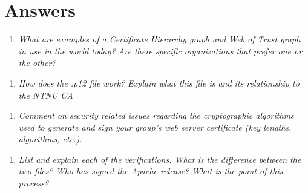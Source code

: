 %
%
%
%
%

\section{Answers}

\begin{enumerate} 
    \item \itshape What are examples of a Certificate Hierarchy graph and Web of Trust graph in use in
          the world today? Are there specific organizations that prefer one or the other?
\end{enumerate}




\begin{enumerate}[resume]
    \item \itshape How does the .p12 file work? Explain what this file is and its relationship to the 
          \textnormal{NTNU CA}
\end{enumerate}




\begin{enumerate}[resume]
    \item \itshape Comment on security related issues regarding the cryptographic algorithms used to
          generate and sign your group’s web server certificate (key lengths, algorithms, etc.).
\end{enumerate}




\begin{enumerate}[resume]
    \item \itshape List and explain each of the verifications. What is the difference between the two files?
Who has signed the Apache release? What is the point of this process?
\end{enumerate}




